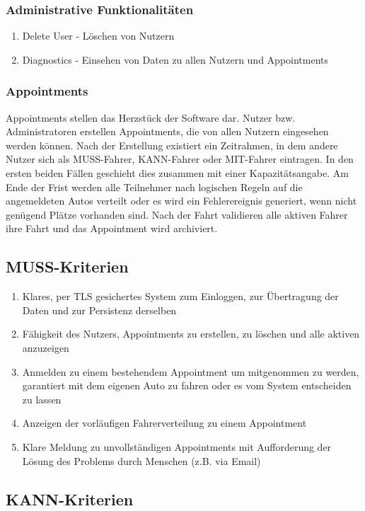 \documentclass[11pt,a4paper]{article}
\begin{document}
\subsubsection{Administrative Funktionalitäten}
\begin{enumerate}
\item Delete User - Löschen von Nutzern
\item Diagnostics - Einsehen von Daten zu allen Nutzern und Appointments
\end{enumerate}
\subsubsection{Appointments}
Appointments stellen das Herzstück der Software dar. Nutzer bzw. Administratoren erstellen Appointments, die von allen Nutzern eingesehen werden können. Nach der Erstellung existiert ein Zeitrahmen, in dem andere Nutzer sich als MUSS-Fahrer, KANN-Fahrer oder MIT-Fahrer eintragen. In den ersten beiden Fällen geschieht dies zusammen mit einer Kapazitätsangabe.
Am Ende der Frist werden alle Teilnehmer nach logischen Regeln auf die angemeldeten Autos verteilt oder es wird ein Fehlerereignis generiert, wenn nicht genügend Plätze vorhanden sind.
Nach der Fahrt validieren alle aktiven Fahrer ihre Fahrt und das Appointment wird archiviert.
\subsection{MUSS-Kriterien}
\begin{enumerate}
\item Klares, per TLS gesichertes System zum Einloggen, zur Übertragung der Daten und zur Persistenz derselben
\item Fähigkeit des Nutzers, Appointments zu erstellen, zu löschen und alle aktiven anzuzeigen
\item Anmelden zu einem bestehendem Appointment um mitgenommen zu werden, garantiert mit dem eigenen Auto zu fahren oder es vom System entscheiden zu lassen
\item Anzeigen der vorläufigen Fahrerverteilung zu einem Appointment
\item Klare Meldung zu unvollständigen Appointments mit Aufforderung der Lösung des Problems durch Menschen (z.B. via Email)
\end{enumerate}

\subsection{KANN-Kriterien}
\end{document}
